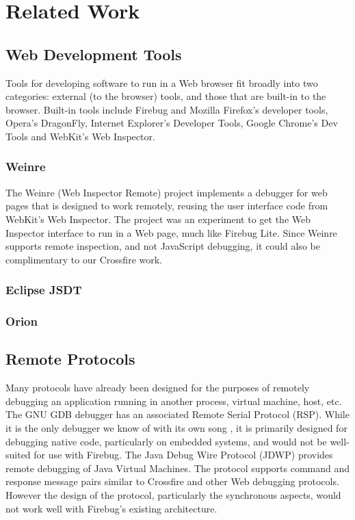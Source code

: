 
\section{Related Work}
\subsection{Web Development Tools}
Tools for developing software to run in a Web browser fit broadly into two
categories: external (to the
browser) tools, and those that are built-in to the browser.
Built-in tools include Firebug and Mozilla Firefox's developer tools,
Opera's DragonFly, Internet Explorer's Developer Tools, Google Chrome's Dev
Tools and WebKit's Web Inspector.

\subsubsection{Weinre}
The Weinre (Web Inspector Remote)\cite{weinre} project implements a debugger for
web pages that is designed to work remotely, reusing the user interface code
from WebKit's Web Inspector. The project was an experiment to get the Web
Inspector interface to run in a Web page, much like Firebug Lite. Since Weinre
supports remote inspection, and not JavaScript debugging, it could also be complimentary
to our Crossfire work.

\subsubsection{Eclipse JSDT}

\subsubsection{Orion}

\subsection{Remote Protocols}
Many protocols have already been designed for the purposes of remotely debugging
an application running in another process, virtual machine, host, etc. The GNU
GDB debugger has an associated Remote Serial Protocol (RSP)\cite{gdb-rsp}. While
it is the only debugger we know of with its own song \cite{gdb-song}, it is
primarily designed for debugging native code, particularly on embedded
systems, and would not be well-suited for use with Firebug. The Java Debug Wire Protocol (JDWP)
\cite{jdwp} provides remote debugging of Java Virtual Machines. The protocol
supports command and response message pairs similar to Crossfire and other Web
debugging protocols. However the design of the protocol, particularly the
synchronous aspects, would not work well with Firebug's existing architecture.
